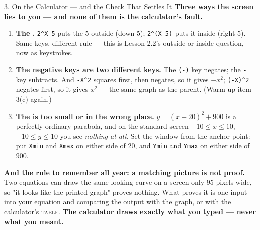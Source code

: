 \documentclass[10pt]{article}
\begin{document}
\begin{notesbox}{3. On the Calculator --- and the Check That Settles It}
\vspace{6pt}
\textbf{Three ways the screen lies to you --- and none of them is the calculator's fault.}
\begin{enumerate}[leftmargin=1.5em, itemsep=3pt, topsep=3pt]
  \item \textbf{The .} \texttt{2\^{}X-5} puts the $5$ outside (down $5$);
        \texttt{2\^{}(X-5)} puts it inside (right $5$). Same keys, different rule --- this is Lesson
        2.2's outside-or-inside question, now as keystrokes.
  \item \textbf{The negative keys are two different keys.} The \texttt{(-)} key negates; the
        \texttt{-} key subtracts. And \texttt{-X\^{}2} squares first, then negates, so it gives
        $-x^2$; \texttt{(-X)\^{}2} negates first, so it gives $x^2$ --- the same graph as the
        parent. (Warm-up item 3(c) again.)
  \item \textbf{The  is too small or in the wrong place.} $y=(x-20)^2+900$ is a
        perfectly ordinary parabola, and on the standard screen $-10 \le x \le 10$,
        $-10 \le y \le 10$ you see \emph{nothing at all}. Set the window from the anchor point: put
        \texttt{Xmin} and \texttt{Xmax} on either side of $20$, and \texttt{Ymin} and \texttt{Ymax}
        on either side of $900$.
\end{enumerate}

\vspace{4pt}
\textbf{And the rule to remember all year: a matching picture is not proof.} Two equations can draw
the same-looking curve on a screen only $95$ pixels wide, so "it looks like the printed graph"
proves nothing. What proves it is  one input into your equation and comparing the
output with the graph, or with the calculator's \textsc{table}. \textbf{The calculator draws exactly
what you typed --- never what you meant.}
\end{notesbox}

\vspace{0.10in}
\end{document}
